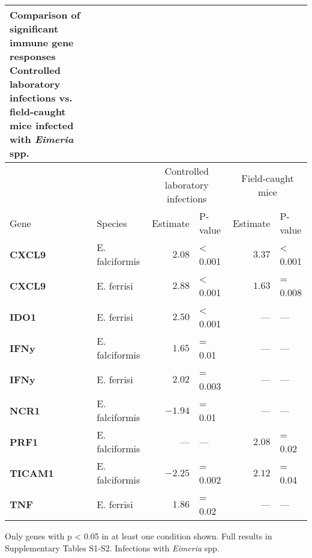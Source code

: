 \setlength{\LTpost}{0mm}
\begin{longtable}{llrlrl}
\caption*{
{\large Comparison of significant immune gene responses} \\ 
{\small Controlled laboratory infections vs. field-caught mice infected with \emph{Eimeria} spp.}
} \\ 
\toprule
 &  & \multicolumn{2}{c}{Controlled laboratory infections} & \multicolumn{2}{c}{Field-caught mice} \\ 
\cmidrule(lr){3-4} \cmidrule(lr){5-6}
Gene & Species & Estimate & P-value & Estimate & P-value \\ 
\midrule\addlinespace[2.5pt]
\textbf{CXCL9} & E. falciformis & $2.08$ & < 0.001 & $3.37$ & < 0.001 \\ 
\textbf{CXCL9} & E. ferrisi & $2.88$ & < 0.001 & $1.63$ & = 0.008 \\ 
\textbf{IDO1} & E. ferrisi & $2.50$ & < 0.001 & — & — \\ 
\textbf{IFNy} & E. falciformis & $1.65$ & = 0.01 & — & — \\ 
\textbf{IFNy} & E. ferrisi & $2.02$ & = 0.003 & — & — \\ 
\textbf{NCR1} & E. falciformis & $-1.94$ & = 0.01 & — & — \\ 
\textbf{PRF1} & E. falciformis & — & — & $2.08$ & = 0.02 \\ 
\textbf{TICAM1} & E. falciformis & $-2.25$ & = 0.002 & $2.12$ & = 0.04 \\ 
\textbf{TNF} & E. ferrisi & $1.86$ & = 0.02 & — & — \\ 
\bottomrule
\end{longtable}
\begin{minipage}{\linewidth}
Only genes with p \textless{} 0.05 in at least one condition shown. Full results in Supplementary Tables S1-S2. Infections with \emph{Eimeria} spp.\\
\end{minipage}

